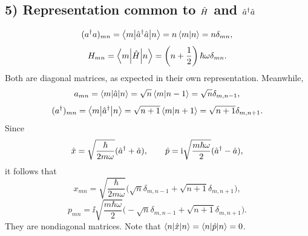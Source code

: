 \subsection*{5) Representation common to $\hat{H}$ and $\hat{a}^{\dagger}\hat{a}$}
\begin{equation}
(a^{\dagger}a)_{mn}=\left\langle m\middle|\hat{a}^{\dagger}\hat{a}\middle|n\right\rangle
=n\left\langle m\middle|n\right\rangle=n\delta_{mn},
\end{equation}
\begin{equation}
H_{mn}=\left\langle m\middle|\hat{H}\middle|n\right\rangle=\left(n+\frac12\right)\hbar\omega\delta_{mn}.
\end{equation}
Both are diagonal matrices, as expected in their own representation. Meanwhile,
\begin{equation}
a_{mn}=\left\langle m\middle|\hat{a}\middle|n\right\rangle=\sqrt n\left\langle m\middle|n-1\right\rangle=\sqrt n\delta_{m,n-1},
\end{equation}
\begin{equation}
(a^{\dagger})_{mn}=\left\langle m\middle|\hat{a}^{\dagger}\middle|n\right\rangle
=\sqrt{n+1}\left\langle m\middle|n+1\right\rangle=\sqrt{n+1}\delta_{m,n+1}.
\end{equation}
Since
\begin{equation}
\hat{x}=\sqrt{\frac\hbar{2m\omega}}(\hat{a}^{\dagger}+\hat{a}),\qquad
\hat{p}=\mathrm{i}\sqrt{\frac{m\hbar\omega}{2}}(\hat{a}^{\dagger}-\hat{a}),
\end{equation}
it follows that
\begin{equation}
x_{mn}=\sqrt{\frac\hbar{2m\omega}}
\bigl(\sqrt n\delta_{m,n-1}+\sqrt{n+1}\delta_{m,n+1}\bigr),
\end{equation}
\begin{equation}
p_{mn}=\ii\sqrt{\frac{m\hbar\omega}{2}}
\bigl(-\sqrt n\delta_{m,n-1}+\sqrt{n+1}\delta_{m,n+1}\bigr).
\end{equation}
They are nondiagonal matrices. Note that $\left\langle n\middle|\hat{x}\middle|n\right\rangle=\left\langle n\middle|\hat{p}\middle|n\right\rangle=0$.

